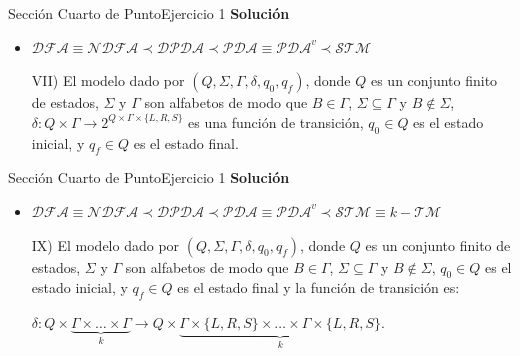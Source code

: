 \documentclass[10pt, envcountsect, presentation, aspectratio=169]{beamer}
\begin{document}

\begin{frame}{Sección Cuarto de Punto}{Ejercicio 1}
    \textbf{Solución}\\
    \begin{itemize}
        \item $\mathcal{DFA} \equiv \mathcal{NDFA} \prec \mathcal{DPDA} \prec \mathcal{PDA} \equiv \mathcal{PDA}^v \prec \mathcal{STM}$
        \item[VII)] El modelo dado por $(Q,\Sigma,\Gamma,\delta,q_0,q_f)$, donde $Q$ es un conjunto finito de estados, $\Sigma$ y $\Gamma$ son alfabetos de modo que $B\in\Gamma$,  $\Sigma\subseteq\Gamma$ y $B \notin \Sigma$, $\delta:Q\times\Gamma\rightarrow 2^{Q\times\Gamma\times\{L,R, S\}}$ es  una función de transición, $q_0\in Q$ es el estado inicial, y $q_f\in Q$ es el estado final.     
    \end{itemize}
\end{frame}


\begin{frame}{Sección Cuarto de Punto}{Ejercicio 1}
    \textbf{Solución}\\
    \begin{itemize}
        \item $\mathcal{DFA} \equiv \mathcal{NDFA} \prec \mathcal{DPDA} \prec \mathcal{PDA} \equiv \mathcal{PDA}^v \prec \mathcal{STM} \equiv k-\mathcal{TM}$
        \item[IX)] El modelo dado por $(Q,\Sigma,\Gamma,\delta,q_0,q_f)$, donde $Q$ es un conjunto finito de estados, $\Sigma$ y $\Gamma$ son alfabetos de modo que $B\in\Gamma$,  $\Sigma\subseteq\Gamma$ y $B \notin \Sigma$, $q_0\in Q$ es el estado inicial, y $q_f\in Q$ es el estado final y la función de transición es:
        \begin{small}
            $\delta:Q\times\underbrace{\Gamma\times\ldots\times\Gamma}_k\rightarrow Q\times\underbrace{\Gamma\times\{L,R,S\}\times\ldots\times\Gamma\times\{L,R,S\}}_k$.
        \end{small} 
    \end{itemize}
\end{frame}

\end{document}
